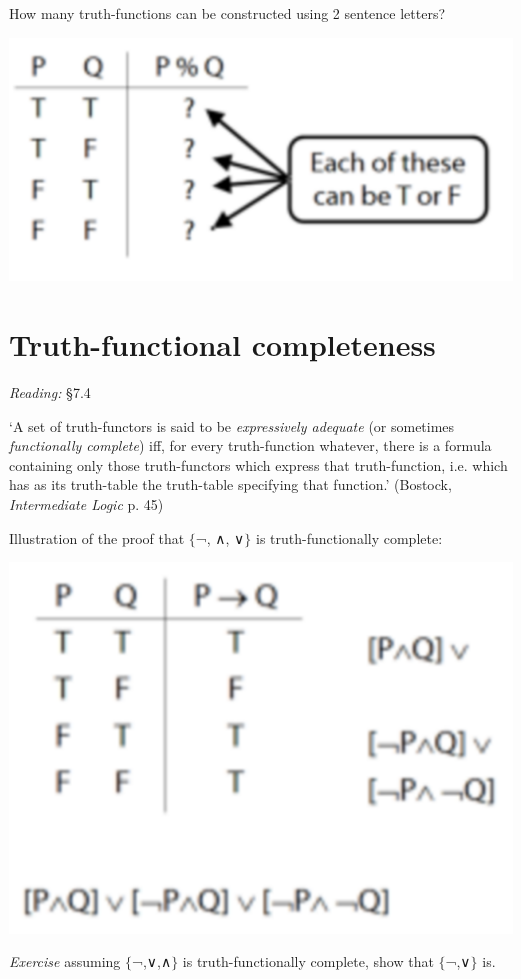 \documentclass[12pt]{extarticle}
\begin{document}
\begin{multicols*}{3}
How many truth-functions can be constructed using 2 sentence letters?
 
\begin{center}
\includegraphics[scale=0.3]{img/unit_430_fig1.pdf}
\end{center}
 
 
\section{Truth-functional completeness}
 
\emph{Reading:} §7.4
 
‘A set of truth-functors is said to be \emph{expressively adequate} (or sometimes \emph{functionally complete}) iff, for every truth-function whatever, there is a formula containing only those truth-functors which express that truth-function, i.e. which has as its truth-table the truth-table specifying that function.’ (Bostock, \emph{Intermediate Logic} p. 45)
 
Illustration of the proof that $\{$¬, ∧, ∨$\}$ is truth-functionally complete:
 
\begin{center}
\includegraphics[scale=0.3]{img/unit_430_fig2.pdf}
\end{center}
\emph{Exercise} assuming $\{$¬,∨,∧$\}$ is truth-functionally complete, show that $\{$¬,∨$\}$ is.
 
 


\end{multicols*}
\end{document}
